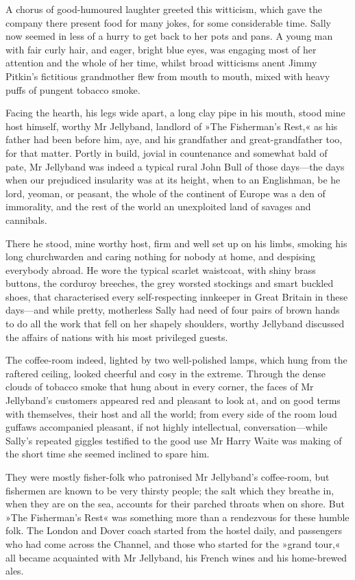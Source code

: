 A chorus of good-humoured laughter greeted this witticism, which gave the company there present food for many jokes, for some considerable time. Sally now seemed in less of a hurry to get back to her pots and pans. A young man with fair curly hair, and eager, bright blue eyes, was engaging most of her attention and the whole of her time, whilst broad witticisms anent Jimmy Pitkin's fictitious grandmother flew from mouth to mouth, mixed with heavy puffs of pungent tobacco smoke.

Facing the hearth, his legs wide apart, a long clay pipe in his mouth, stood mine host himself, worthy Mr Jellyband, landlord of »The Fisherman's Rest,« as his father had been before him, aye, and his grandfather and great-grandfather too, for that matter. Portly in build, jovial in countenance and somewhat bald of pate, Mr Jellyband was indeed a typical rural John Bull of those days—the days when our prejudiced insularity was at its height, when to an Englishman, be he lord, yeoman, or peasant, the whole of the continent of Europe was a den of immorality, and the rest of the world an unexploited land of savages and cannibals.

There he stood, mine worthy host, firm and well set up on his limbs, smoking his long churchwarden and caring nothing for nobody at home, and despising everybody abroad. He wore the typical scarlet waistcoat, with shiny brass buttons, the corduroy breeches, the grey worsted stockings and smart buckled shoes, that characterised every self-respecting innkeeper in Great Britain in these days—and while pretty, motherless Sally had need of four pairs of brown hands to do all the work that fell on her shapely shoulders, worthy Jellyband discussed the affairs of nations with his most privileged guests.

The coffee-room indeed, lighted by two well-polished lamps, which hung from the raftered ceiling, looked cheerful and cosy in the extreme. Through the dense clouds of tobacco smoke that hung about in every corner, the faces of Mr Jellyband's customers appeared red and pleasant to look at, and on good terms with themselves, their host and all the world; from every side of the room loud guffaws accompanied pleasant, if not highly intellectual, conversation—while Sally's repeated giggles testified to the good use Mr Harry Waite was making of the short time she seemed inclined to spare him.

They were mostly fisher-folk who patronised Mr Jellyband's coffee-room, but fishermen are known to be very thirsty people; the salt which they breathe in, when they are on the sea, accounts for their parched throats when on shore. But »The Fisherman's Rest« was something more than a rendezvous for these humble folk. The London and Dover coach started from the hostel daily, and passengers who had come across the Channel, and those who started for the »grand tour,« all became acquainted with Mr Jellyband, his French wines and his home-brewed ales.

